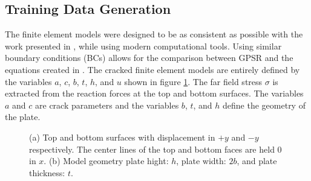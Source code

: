 


\subsection{Training Data Generation}

The finite element models were designed to be as consistent as possible with the work presented in \cite{RNeqnsbook}, while using modern computational tools. Using similar boundary conditions (BCs) allows for the comparison between GPSR and the equations created in \cite{RNeqnsbook}. The cracked finite element models are entirely defined by the variables $a$, $c$, $b$, $t$, $h$, and $u$ shown in figure \ref{fig:model_params}. The far field stress $\sigma$ is extracted from the reaction forces at the top and bottom surfaces. The variables $a$ and $c$ are crack parameters and the variables $b$, $t$, and $h$ define the geometry of the plate.

\begin{figure}%
    \centering
    \qquad
    \caption{(a) Top and bottom surfaces with displacement in $+y$ and $-y$ respectively. The center lines of the top and bottom faces are held $0$ in $x$. (b) Model geometry plate hight: $h$, plate width: $2b$, and plate thickness: $t$.}%
    \label{fig:model_params}%
\end{figure}
	
